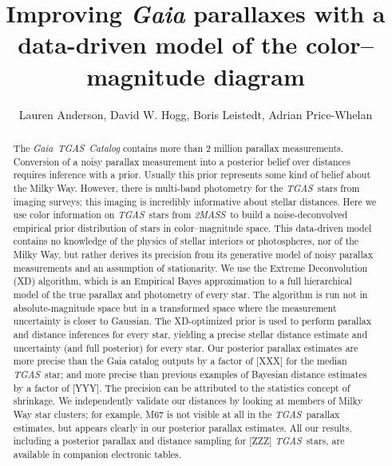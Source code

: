 \documentclass[12pt, preprint]{aastex6}
\newcommand{\acronym}[1]{{\small{#1}}}
\newcommand{\project}[1]{\textsl{#1}}
\newcommand{\tgas}{\project{\acronym{TGAS}}}
\newcommand{\tmass}{\project{\acronym{2MASS}}}
\newcommand{\gaia}{\project{Gaia}}
\newcommand{\xd}{\acronym{XD}}
\begin{document}
\sloppy\sloppypar\raggedbottom\frenchspacing

\title{Improving \textsl{Gaia} parallaxes
       with a data-driven model of the color--magnitude diagram}
\author{Lauren Anderson,
        David W. Hogg,
        Boris Leistedt,
        Adrian Price-Whelan}

\begin{abstract}
The \gaia\ \tgas\ \project{Catalog} contains more than 2 million parallax measurements.
Conversion of a noisy parallax measurement into a posterior belief over distances requires inference with a prior.
Usually this prior represents some kind of belief about the Milky Way.
However, there is multi-band photometry for the \tgas\ stars from imaging surveys;
this imaging is incredibly informative about stellar distances.
Here we use color information on \tgas\ stars from \tmass\ to build a noise-deconvolved empirical prior distribution of stars in color--magnitude space.
This data-driven model contains no knowledge of the physics of stellar interiors or photospheres, nor of the Milky Way, but rather derives its precision from its generative model of noisy parallax measurements and an assumption of stationarity.
We use the Extreme Deconvolution (\xd) algorithm, which is an Empirical Bayes approximation to a full hierarchical model of the true parallax and photometry of every star.
The algorithm is run not in absolute-magnitude space but in a transformed space where the measurement uncertainty is closer to Gaussian.
The \xd-optimized prior is used to perform parallax and distance inferences for every star, yielding a precise stellar distance estimate and uncertainty (and full posterior) for every star.
Our posterior parallax estimates are more precise than the Gaia catalog outputs by a factor of [XXX] for the median \tgas\ star; and more precise than previous examples of Bayesian distance estimates by a factor of [YYY].
The precision can be attributed to the statistics concept of shrinkage.
We independently validate our distances by looking at members of Milky Way star clusters; for example, M67 is not visible at all in the \tgas\ parallax estimates, but appears clearly in our posterior parallax estimates.
All our results, including a posterior parallax and distance sampling for [ZZZ] \tgas\ stars, are available in companion electronic tables.
\end{abstract}
\end{document}
